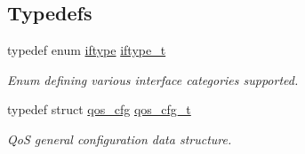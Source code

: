 \subsection*{Typedefs}
\begin{DoxyCompactItemize}
\item 
\hypertarget{group__FAPI__QOS__GENERAL_ga23c1893cfe6a7875c1a418338c6f09ad}{typedef enum \hyperlink{group__FAPI__QOS__GENERAL_ga6da5ac0600c64e9e1a79cd25a4a18680}{iftype} \hyperlink{group__FAPI__QOS__GENERAL_ga23c1893cfe6a7875c1a418338c6f09ad}{iftype\-\_\-t}}\label{group__FAPI__QOS__GENERAL_ga23c1893cfe6a7875c1a418338c6f09ad}

\begin{DoxyCompactList}\small\item\em Enum defining various interface categories supported. \end{DoxyCompactList}\item 
\hypertarget{group__FAPI__QOS__GENERAL_gabfc98fb0c7c5226badf1eb79b4ab6e2b}{typedef struct \hyperlink{structqos__cfg}{qos\-\_\-cfg} \hyperlink{group__FAPI__QOS__GENERAL_gabfc98fb0c7c5226badf1eb79b4ab6e2b}{qos\-\_\-cfg\-\_\-t}}\label{group__FAPI__QOS__GENERAL_gabfc98fb0c7c5226badf1eb79b4ab6e2b}

\begin{DoxyCompactList}\small\item\em Qo\-S general configuration data structure. \end{DoxyCompactList}\end{DoxyCompactItemize}
